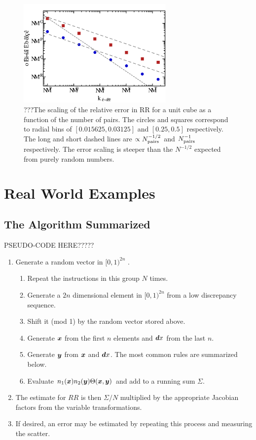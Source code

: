 \documentclass[usenatbib]{mn2e}
\begin{document}
\begin{figure}
\includegraphics[width=3in]{plots/unit3d}
\caption{???The scaling of the relative error in RR for a unit cube as a
function of the number of pairs. The circles and squares correspond to radial
bins of $[0.015625,0.03125]$ and $[0.25,0.5]$ respectively.
The long and short dashed lines are $\propto N_{\rm pairs}^{-1/2}$ and $N_{\rm pairs}^{-1}$ respectively. The error
scaling is steeper than the $N^{-1/2}$ expected from purely random numbers.}
\label{fig:unit3d}
\end{figure}

\section{Real World Examples}

\subsection{The Algorithm Summarized}
\label{sec:alg}

PSEUDO-CODE HERE?????
\begin{enumerate}
  \item Generate a random vector in $[0,1)^{2n}$ .
  \begin{enumerate}
    \item Repeat the instructions in this group $N$ times.
    \item Generate a $2n$ dimensional element in $[0,1)^{2n}$ from a low
    discrepancy sequence.
    \item Shift it (mod 1) by the random vector stored above.
    \item Generate ${\bm x}$ from the first $n$ elements and ${\bm dx}$ from the last
    $n$.
    \item Generate ${\bm y}$ from ${\bm x}$ and ${\bm dx}$. The most common rules are
    summarized below.
    \item Evaluate $n_1({\bm x}) n_2({\bm y}) \Theta({\bm x}, {\bm y})$ and add to a running sum
    $\Sigma$.
  \end{enumerate}
  \item The estimate for $RR$ is then $\Sigma/N$ multiplied by the appropriate
  Jacobian factors from the variable transformations. 
  \item If desired, an error may be estimated by repeating this process and
  measuring the scatter. 
\end{enumerate}
\end{document}
